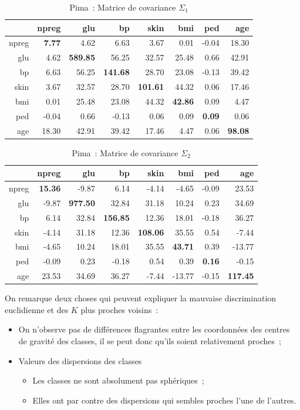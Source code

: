 \documentclass[a4paper,10pt]{report}
\begin{document}
\begin{table}[H]
	\centering
	\begin{tabular}{r|rrrrrrr}
		& npreg & glu & bp & skin & bmi & ped & age \\ 
		\hline
		npreg & \textbf{7.77} & 4.62 & 6.63 & 3.67 & 0.01 & -0.04 & 18.30 \\ 
		glu & 4.62 & \textbf{589.85} & 56.25 & 32.57 & 25.48 & 0.66 & 42.91 \\ 
		bp & 6.63 & 56.25 & \textbf{141.68} & 28.70 & 23.08 & -0.13 & 39.42 \\ 
		skin & 3.67 & 32.57 & 28.70 & \textbf{101.61} & 44.32 & 0.06 & 17.46 \\ 
		bmi & 0.01 & 25.48 & 23.08 & 44.32 & \textbf{42.86} & 0.09 & 4.47 \\ 
		ped & -0.04 & 0.66 & -0.13 & 0.06 & 0.09 & \textbf{0.09} & 0.06 \\ 
		age & 18.30 & 42.91 & 39.42 & 17.46 & 4.47 & 0.06 & \textbf{98.08} \\ 
	\end{tabular}
	\caption{Pima~: Matrice de covariance $\Sigma_{1}$}
\end{table}

\begin{table}[H]
	\centering
	\begin{tabular}{r|rrrrrrr}
		& npreg & glu & bp & skin & bmi & ped & age \\ 
		\hline
		npreg & \textbf{15.36} & -9.87 & 6.14 & -4.14 & -4.65 & -0.09 & 23.53 \\ 
		glu & -9.87 & \textbf{977.50} & 32.84 & 31.18 & 10.24 & 0.23 & 34.69 \\ 
		bp & 6.14 & 32.84 & \textbf{156.85} & 12.36 & 18.01 & -0.18 & 36.27 \\ 
		skin & -4.14 & 31.18 & 12.36 & \textbf{108.06} & 35.55 & 0.54 & -7.44 \\ 
		bmi & -4.65 & 10.24 & 18.01 & 35.55 & \textbf{43.71} & 0.39 & -13.77 \\ 
		ped & -0.09 & 0.23 & -0.18 & 0.54 & 0.39 & \textbf{0.16} & -0.15 \\ 
		age & 23.53 & 34.69 & 36.27 & -7.44 & -13.77 & -0.15 & \textbf{117.45} \\ 
	\end{tabular}
	\caption{Pima~: Matrice de covariance $\Sigma_{2}$}
\end{table}



On remarque deux choses qui peuvent expliquer la mauvaise discrimination euclidienne et des $K$ plus proches voisins~:
\begin{itemize}
	\item On n'observe pas de différences flagrantes entre les coordonnées des centres de gravité des classes, il se peut donc qu'ils soient relativement proches~;
	\item Valeurs des dispersions des classes
	\begin{itemize}
		\item Les classes ne sont absolument pas sphériques~;
		\item Elles ont par contre des dispersions qui sembles proches l'une de l'autres.
	\end{itemize}
\end{itemize}
\end{document}
